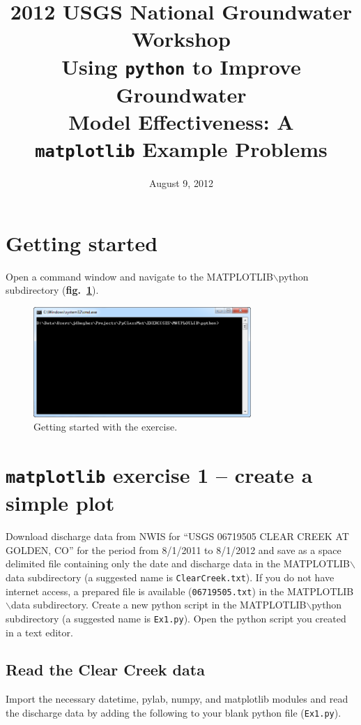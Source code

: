 \documentclass[12pt]{article}
\title{2012 USGS National Groundwater Workshop \\ Using \texttt{python} to Improve Groundwater \\ Model Effectiveness: A \\ \texttt{matplotlib} Example Problems}
\author{}
\date{August 9, 2012}
\begin{document}
\maketitle

\section{Getting started}
Open a command window and navigate to the MATPLOTLIB$\backslash$python subdirectory (\textbf{fig.~\ref{FigGettingStarted}}).

\begin{figure}
	\centering
  	\includegraphics[width=8.25cm]{figures/GettingStarted.png}
 	\caption{Getting started with the exercise.}
	\label{FigGettingStarted}
\end{figure}

\section{\texttt{matplotlib} exercise 1 -- create a simple plot}
Download discharge data from NWIS for ``USGS 06719505 CLEAR CREEK AT GOLDEN, CO'' for the period from 8/1/2011 to 8/1/2012 and save as a space delimited file containing only the date and discharge data in the MATPLOTLIB$\backslash$data subdirectory (a suggested name is \texttt{ClearCreek.txt}). If you do not have internet access, a prepared file is available (\texttt{06719505.txt}) in the MATPLOTLIB$\backslash$data subdirectory. Create a new python script in the MATPLOTLIB$\backslash$python subdirectory (a suggested name is \texttt{Ex1.py}). Open the python script you created in a text editor.

\subsection{Read the Clear Creek data}
Import the necessary datetime, pylab, numpy, and matplotlib modules and read the discharge data by adding the following to your blank python file (\texttt{Ex1.py}).

\begin{center}
	
\end{center}
\end{document}
